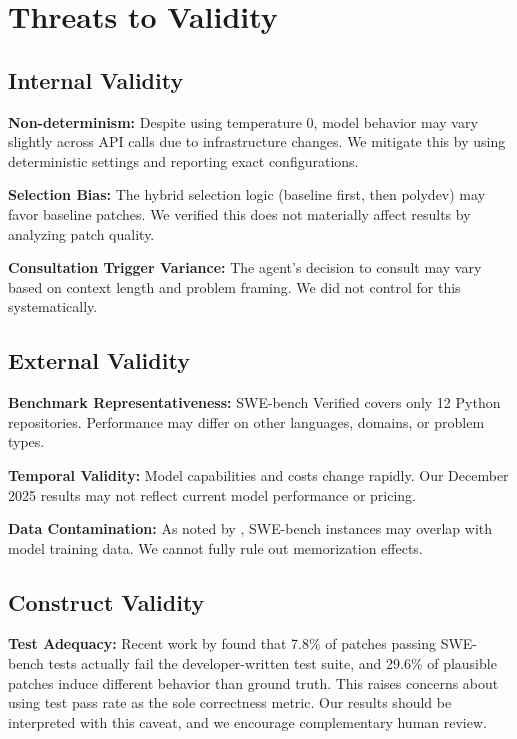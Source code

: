 \documentclass[11pt,a4paper]{article}
\begin{document}
\section{Threats to Validity}

\subsection{Internal Validity}

\textbf{Non-determinism:} Despite using temperature 0, model behavior may vary slightly across API calls due to infrastructure changes. We mitigate this by using deterministic settings and reporting exact configurations.

\textbf{Selection Bias:} The hybrid selection logic (baseline first, then polydev) may favor baseline patches. We verified this does not materially affect results by analyzing patch quality.

\textbf{Consultation Trigger Variance:} The agent's decision to consult may vary based on context length and problem framing. We did not control for this systematically.

\subsection{External Validity}

\textbf{Benchmark Representativeness:} SWE-bench Verified covers only 12 Python repositories. Performance may differ on other languages, domains, or problem types.

\textbf{Temporal Validity:} Model capabilities and costs change rapidly. Our December 2025 results may not reflect current model performance or pricing.

\textbf{Data Contamination:} As noted by \citet{prathifkumar2025contamination}, SWE-bench instances may overlap with model training data. We cannot fully rule out memorization effects.

\subsection{Construct Validity}

\textbf{Test Adequacy:} Recent work by \citet{wang2025patchcorrectness} found that 7.8\% of patches passing SWE-bench tests actually fail the developer-written test suite, and 29.6\% of plausible patches induce different behavior than ground truth. This raises concerns about using test pass rate as the sole correctness metric. Our results should be interpreted with this caveat, and we encourage complementary human review.
\end{document}
